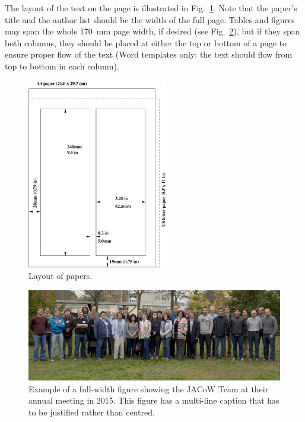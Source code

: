 \documentclass[a4paper,
              ]{jacow}
\begin{document}
The layout of the text on the page is illustrated in
Fig.~\ref{l2ea4-f1}. Note that the paper’s title and the author list should
be the width of the full page. Tables and figures may span
the whole \SI{170}{mm} page width, if desired (see Fig.~\ref{l2ea4-f2}), but
if they span both columns, they should be placed at either
the top or bottom of a page to ensure proper flow of the
text (Word templates only: the text should flow from top
to bottom in each column).

\begin{figure}[!htb]
   \centering
   \includegraphics*[width=174pt]{JACpic_mc}
   \caption{Layout of papers.}
   \label{l2ea4-f1}
\end{figure}

\begin{figure}[!tbh]
    \centering
    \includegraphics*[width=\textwidth]{JACpic2v5}

    \caption{Example of a full-width figure showing the JACoW Team at their annual
    	     meeting in 2015. This figure has a multi-line caption that has to be
    	     justified rather than centred.}
    \label{l2ea4-f2}
\end{figure}
\end{document}
